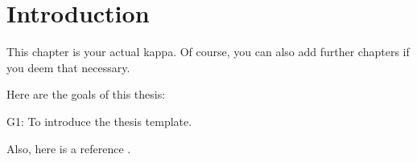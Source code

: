 \chapter{Introduction}
\label{chap_Introduction}
This chapter is your actual kappa.
%
Of course, you can also add further chapters if you deem that necessary.

Here are the goals of this thesis:
\begin{LaTeXdescription}
 \item[G1:] To introduce the thesis template.
\end{LaTeXdescription}

Also, here is a reference \cite{liebel16sosym}.